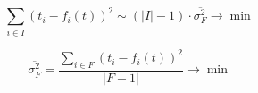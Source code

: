 \begin{equation*}
  \sum_{i \in I} \left( t_i - f_i\left( t \right) \right)^2
  \sim \left( \left| I \right| - 1 \right) \cdot \overline{\sigma_F^2}
  \to \min
\end{equation*}

\begin{equation*}
  \overline{\sigma_F^2}
  = \frac{\sum\limits_{i \in F} \left( t_i - f_i\left( t \right) \right)^2}
         {\left| F - 1 \right|}
  \to \min
\end{equation*}
